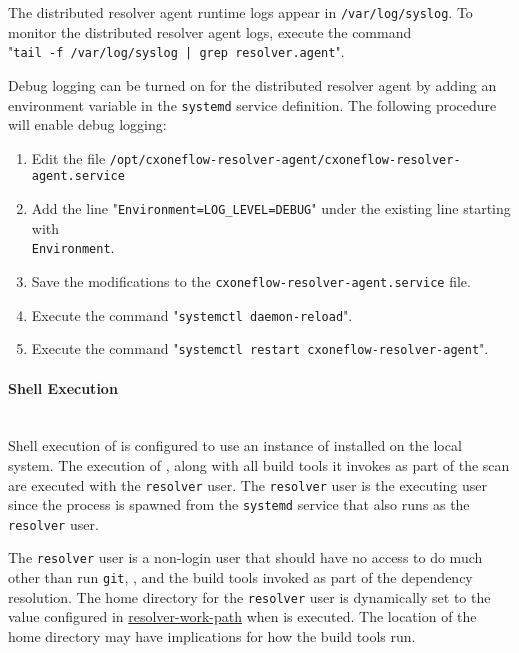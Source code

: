The distributed resolver agent runtime logs appear in \texttt{/var/log/syslog}.  To monitor the distributed resolver agent logs, execute the command
\\"\texttt{tail -f /var/log/syslog | grep resolver.agent}".

Debug logging can be turned on for the distributed resolver agent by adding an environment variable in the \texttt{systemd}
service definition.  The following procedure will enable debug logging:

\begin{enumerate}
  \item Edit the file \texttt{/opt/cxoneflow-resolver-agent/cxoneflow-resolver-agent.service}
  \item Add the line "\texttt{Environment=LOG\_LEVEL=DEBUG}" under the existing line starting with\\\texttt{Environment}.
  \item Save the modifications to the \texttt{cxoneflow-resolver-agent.service} file.
  \item Execute the command "\texttt{systemctl daemon-reload}".
  \item Execute the command "\texttt{systemctl restart cxoneflow-resolver-agent}".
\end{enumerate}

\paragraph{Shell Execution}\label{par:agent-shell-execution}

\noindent\\Shell execution of \scaresolver is configured to use an instance of \scaresolver installed on the local system.
The execution of \scaresolverns, along with all build tools it invokes as part of the scan are executed with the \texttt{resolver}
user.  The \texttt{resolver} user is the executing user since the process is spawned from the \texttt{systemd} service that also
runs as the \texttt{resolver} user.

The \texttt{resolver} user is a non-login user that should have no access to do much other than run \texttt{git}, \scaresolverns, and
the build tools invoked as part of the dependency resolution.  The home directory for the \texttt{resolver} user is dynamically set
to the value configured in \hyperref[sec:agent-resolver-work-path]{resolver-work-path} when \scaresolver is executed.  The location
of the home directory may have implications for how the build tools run.

